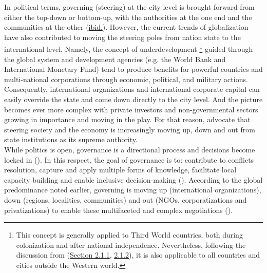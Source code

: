 \documentclass[11pt]{report}
\begin{document}
{{{In political terms, governing (steering) at the city level is brought forward from either the top-down or bottom-up, with the authorities at the one end and the communities at the other (\href{Hudson}{ibid.}).
However, the current trends of globalization have also contributed to moving the steering poles from nation state to the international level.
Namely, the concept of underdevelopment
\footnote{This concept is generally applied to Third World countries, both during colonization and after national independence. Nevertheless, following the discussion from (\href{Section 2.1.1}{Section 2.1.1}, \href{Section 2.1.2}{2.1.2}), it is also applicable to all countries and cities outside the Western world.}
guided through the global system and development agencies (e.g. the World Bank and International Monetary Fund) tend to produce benefits for powerful countries and multi-national corporations through economic, political, and military actions.
\\

Consequently, international organizations and international corporate capital can easily override the state and come down directly to the city level.
And the picture becomes ever more complex with private investors and non-governmental sectors growing in importance and moving in the play.
For that reason, \href{Pierre}{\cite{pierre_governance_2000}}
advocate that steering society and the economy is increasingly moving up, down and out from  state institutions as its supreme authority.
\\

While politics is open, governance is a directional process and decisions become locked in (\href{Hudson}{\citealt{hudson_political_2014}}).
In this respect, the goal of governance is to: contribute to conflicts resolution, capture and apply multiple  forms  of  knowledge, facilitate local capacity building and enable inclusive decision-making (\href{Mathur}{\citealt{mathur_defining_2007}}).
According to the global predominance noted earlier,  governing is moving up (international organizations), down (regions, localities, communities) and out (NGOs, corporatizations and privatizations) to enable these multifaceted and complex negotiations (\href{Pierre}{\citealt{pierre_governance_2000}}).
\\

}}}
\end{document}
